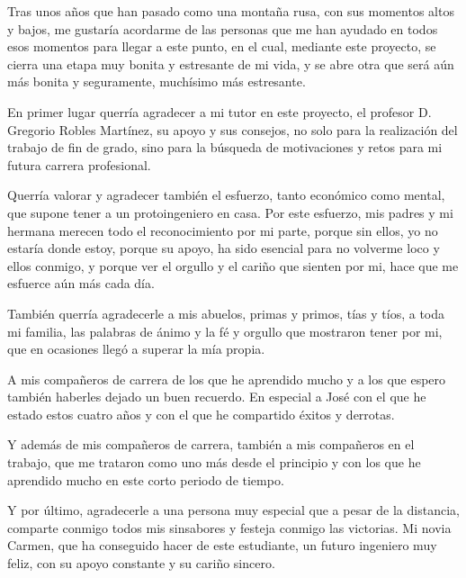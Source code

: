 \documentclass[a4paper, spanish, 12pt]{book}
\begin{document}
Tras unos a\~nos que han pasado como una monta\~na rusa, con sus momentos altos y bajos,
me gustar\'ia acordarme de las personas que me han ayudado en todos esos momentos
para llegar a este punto, en el cual, mediante este proyecto, se cierra una etapa muy bonita y estresante de mi vida,
y se abre otra que ser\'a a\'un m\'as bonita y seguramente, much\'isimo m\'as estresante.\par

En primer lugar querr\'ia agradecer a mi tutor en este proyecto, el profesor D. Gregorio
Robles Mart\'inez, su apoyo y sus consejos, no solo para la realizaci\'on del trabajo
de fin de grado, sino para la b\'usqueda de motivaciones y retos para mi futura carrera
profesional.\par

Querr\'ia valorar y agradecer tambi\'en el esfuerzo, tanto econ\'omico como mental, que supone
tener a un protoingeniero en casa. Por este esfuerzo, mis padres y mi hermana merecen todo
el reconocimiento por mi parte, porque sin ellos, yo no estar\'ia donde estoy,
porque su apoyo, ha sido esencial para no volverme loco y ellos conmigo, y porque
ver el orgullo y el cari\~no que sienten por mi, hace que me esfuerce a\'un m\'as cada d\'ia.\par

Tambi\'en querr\'ia agradecerle a mis abuelos, primas y primos, t\'ias y t\'ios,
a toda mi familia, las palabras de \'animo y la f\'e y orgullo que mostraron tener
por mi, que en ocasiones lleg\'o a superar la m\'ia propia.\par

A mis compa\~neros de carrera de los que he aprendido mucho y a los que espero tambi\'en
haberles dejado un buen recuerdo. En especial a Jos\'e con el que he estado estos cuatro
a\~nos y con el que he compartido \'exitos y derrotas.\par

Y adem\'as de mis compa\~neros de carrera, tambi\'en a mis compa\~neros en el trabajo,
que me trataron como uno m\'as desde el principio y con los que he aprendido mucho en
este corto periodo de tiempo.\par

Y por \'ultimo, agradecerle a una persona muy especial que a pesar de la distancia,
comparte conmigo todos mis sinsabores y festeja conmigo las victorias.
Mi novia Carmen, que ha conseguido hacer de este estudiante, un futuro ingeniero muy
feliz, con su apoyo constante y su cari\~no sincero.\par
\end{document}
